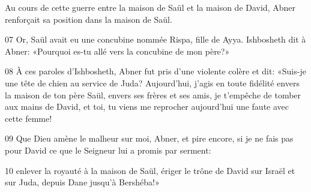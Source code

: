 Au cours de cette guerre entre la maison de Saül et la maison de David, Abner renforçait sa position dans la maison de Saül.

07 Or, Saül avait eu une concubine nommée Rispa, fille de Ayya. Ishbosheth dit à Abner: «Pourquoi es-tu allé vers la concubine de mon père?»

08 À ces paroles d’Ishbosheth, Abner fut pris d’une violente colère et dit: «Suis-je une tête de chien au service de Juda? Aujourd’hui, j’agis en toute fidélité envers la maison de ton père Saül, envers ses frères et ses amis, je t’empêche de tomber aux mains de David, et toi, tu viens me reprocher aujourd’hui une faute avec cette femme!

09 Que Dieu amène le malheur sur moi, Abner, et pire encore, si je ne fais pas pour David ce que le Seigneur lui a promis par serment:

10 enlever la royauté à la maison de Saül, ériger le trône de David sur Israël et sur Juda, depuis Dane jusqu’à Bershéba!»
